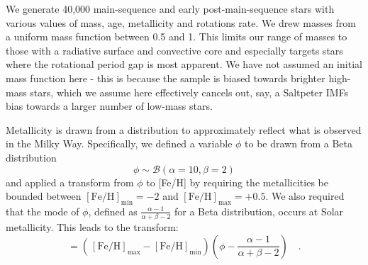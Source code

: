 
We generate 40,000 main-sequence and early post-main-sequence stars with various values of mass, age, metallicity and rotations rate.
We drew masses from a uniform mass function between 0.5 and 1. 
This limits our range of masses to those with a radiative surface and convective core and especially targets stars where the rotational period gap is most apparent. 
We have not assumed an initial mass function here - this is because the \kepler{} sample is biased towards brighter high-mass stars, which we assume here effectively cancels out, say, a Saltpeter IMFs bias towards a larger number of low-mass stars.

Metallicity is drawn from a distribution to approximately reflect what is observed in the Milky Way. Specifically, we defined a variable $\phi$ to be drawn from a Beta distribution
\begin{equation}
  \phi \sim \mathcal{B}\left(\alpha=10, \beta=2\right)
\end{equation}
and applied a transform from $\phi$ to [Fe/H] by requiring the metallicities be bounded between $[\mathrm{Fe/H}]_\mathrm{min} =-2$ and $[\mathrm{Fe/H}]_\mathrm{max} = +0.5$. We also required that the mode of $\phi$, defined as $\frac{\alpha - 1}{\alpha + \beta - 2}$ for a Beta distribution, occurs at Solar metallicity. This leads to the transform:
\begin{equation}
  [\mathrm{Fe/H}] = \left(\frac{}{}[\mathrm{Fe/H}]_\mathrm{max}-[\mathrm{Fe/H}]_\mathrm{min}\right)\left(\phi - \frac{\alpha - 1}{\alpha + \beta - 2}\right) \quad .
\end{equation}

